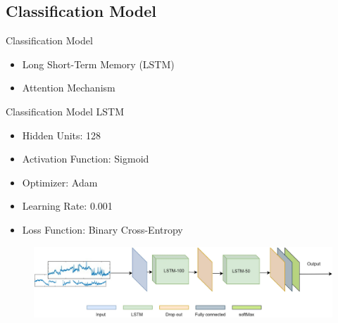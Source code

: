 \subsection*{Classification Model}
\begin{frame}{Classification Model}
    \begin{itemize}
        \item Long Short-Term Memory (LSTM)
        \item Attention Mechanism
    \end{itemize}
\end{frame}
\begin{frame}{Classification Model \textemdash{} LSTM}
    \begin{minipage}[c]{.6\textwidth}
        \begin{itemize}
            \item Hidden Units: 128
            \item Activation Function: Sigmoid
            \item Optimizer: Adam
            \item Learning Rate: 0.001
            \item Loss Function: Binary Cross-Entropy
        \end{itemize}
    \end{minipage}
    \begin{minipage}[c]{.39\textwidth}
        \begin{figure}[!htbp]
            \centering
            \includegraphics[width=\textwidth]{figures/Methodology/LSTM}
        \end{figure}
    \end{minipage}
\end{frame}
